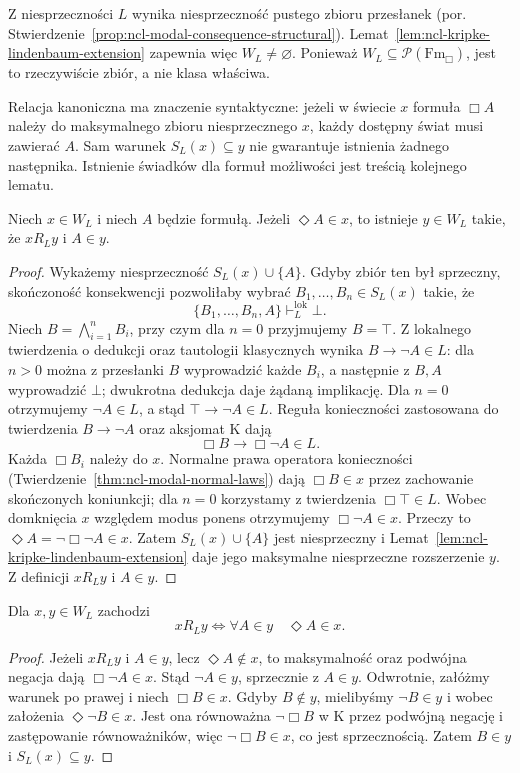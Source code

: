 Z niesprzeczności $L$ wynika niesprzeczność
pustego zbioru przesłanek (por.
Stwierdzenie~\ref{prop:ncl-modal-consequence-structural}).
Lemat~\ref{lem:ncl-kripke-lindenbaum-extension}
zapewnia więc $W_L\ne\varnothing$.
Ponieważ $W_L\subseteq\mathcal P(\mathrm{Fm}_{\Box})$,
jest to rzeczywiście zbiór, a nie klasa właściwa.

Relacja kanoniczna ma znaczenie syntaktyczne:
jeżeli w świecie $x$ formuła $\Box A$ należy
do maksymalnego zbioru niesprzecznego $x$, każdy dostępny
świat musi zawierać $A$. Sam warunek
$S_L(x)\subseteq y$ nie gwarantuje istnienia
żadnego następnika. Istnienie świadków
dla formuł możliwości jest treścią kolejnego lematu.

\begin{lemat}
\label{lem:ncl-kripke-canonical-successor}
Niech $x\in W_L$ i niech $A$ będzie formułą.
Jeżeli $\Diamond A\in x$, to istnieje
$y\in W_L$ takie, że $xR_Ly$ i $A\in y$.
\end{lemat}
\begin{proof}
Wykażemy niesprzeczność $S_L(x)\cup\{A\}$.
Gdyby zbiór ten był sprzeczny, skończoność
konsekwencji pozwoliłaby wybrać
$B_1,\ldots,B_n\in S_L(x)$ takie, że
\[
 \{B_1,\ldots,B_n,A\}\vdash_L^{\mathrm{lok}}\bot.
\]
Niech $B=\bigwedge_{i=1}^{n}B_i$,
przy czym dla $n=0$ przyjmujemy $B=\top$.
Z lokalnego twierdzenia o dedukcji oraz
tautologii klasycznych wynika $B\to\neg A\in L$:
dla $n>0$ można z przesłanki $B$ wyprowadzić
każde $B_i$, a następnie z $B,A$ wyprowadzić
$\bot$; dwukrotna dedukcja daje żądaną
implikację. Dla $n=0$ otrzymujemy
$\neg A\in L$, a stąd $\top\to\neg A\in L$.
Reguła konieczności zastosowana do twierdzenia
$B\to\neg A$ oraz aksjomat K dają
\[
 \Box B\to\Box\neg A\in L.
\]
Każda $\Box B_i$ należy do $x$.
Normalne prawa operatora konieczności
(Twierdzenie~\ref{thm:ncl-modal-normal-laws})
dają $\Box B\in x$ przez zachowanie
skończonych koniunkcji; dla $n=0$
korzystamy z twierdzenia $\Box\top\in L$.
Wobec domknięcia $x$ względem modus ponens
otrzymujemy $\Box\neg A\in x$.
Przeczy to $\Diamond A=\neg\Box\neg A\in x$.
Zatem $S_L(x)\cup\{A\}$ jest niesprzeczny
i Lemat~\ref{lem:ncl-kripke-lindenbaum-extension}
daje jego maksymalne niesprzeczne rozszerzenie $y$.
Z definicji $xR_Ly$ i $A\in y$.
\end{proof}

\begin{wniosek}
\label{cor:ncl-kripke-canonical-relation-dual}
Dla $x,y\in W_L$ zachodzi
\[
 xR_Ly\iff
 \forall A\in y\quad\Diamond A\in x.
\]
\end{wniosek}
\begin{proof}
Jeżeli $xR_Ly$ i $A\in y$, lecz
$\Diamond A\notin x$, to maksymalność oraz
podwójna negacja dają $\Box\neg A\in x$.
Stąd $\neg A\in y$, sprzecznie z $A\in y$.
Odwrotnie, załóżmy warunek po prawej
i niech $\Box B\in x$. Gdyby $B\notin y$,
mielibyśmy $\neg B\in y$ i wobec założenia
$\Diamond\neg B\in x$. Jest ona równoważna
$\neg\Box B$ w K przez podwójną negację
i zastępowanie równoważników, więc
$\neg\Box B\in x$, co jest sprzecznością.
Zatem $B\in y$ i $S_L(x)\subseteq y$.
\end{proof}

